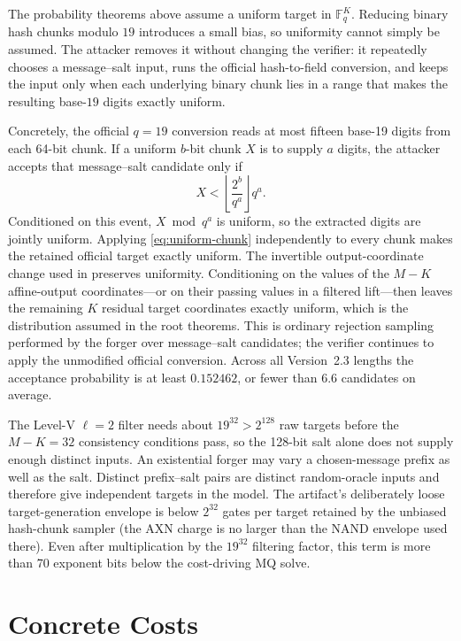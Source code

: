 \documentclass[11pt]{article}
\newcommand{\F}{\mathbb F}
\begin{document}
The probability theorems above assume a uniform target in $\F_q^K$.  Reducing
binary hash chunks modulo $19$ introduces a small bias, so uniformity cannot
simply be assumed.  The attacker removes it without changing the verifier: it
repeatedly chooses a message--salt input, runs the official hash-to-field
conversion, and keeps the input only when each underlying binary chunk lies in
a range that makes the resulting base-$19$ digits exactly uniform.

Concretely, the official $q=19$ conversion reads at most fifteen base-19 digits
from each 64-bit chunk.  If a uniform $b$-bit chunk $X$ is to supply $a$
digits, the attacker accepts that message--salt candidate only if
\begin{equation}\label{eq:uniform-chunk}
 X<\left\lfloor\frac{2^b}{q^a}\right\rfloor q^a.
\end{equation}
Conditioned on this event, $X\bmod q^a$ is uniform, so the extracted
digits are jointly uniform.  Applying \eqref{eq:uniform-chunk} independently
to every chunk makes the retained official target exactly uniform.  The
invertible output-coordinate change used in 
preserves uniformity.  Conditioning on the values of the $M-K$ affine-output coordinates---or on
their passing values in a filtered lift---then leaves the remaining $K$
residual target coordinates exactly uniform, which is the distribution
assumed in the root theorems.  This is
ordinary rejection sampling performed by the forger over message--salt
candidates; the verifier continues to apply the unmodified official
conversion.  Across all Version~2.3 lengths the acceptance probability is at
least $0.152462$, or fewer than 6.6 candidates on average.

The Level-V $\ell=2$ filter needs about $19^{32}>2^{128}$ raw targets before
the $M-K=32$ consistency conditions pass, so the 128-bit salt alone does not
supply enough distinct inputs.  An existential forger may vary a chosen-message
prefix as well as the salt.  Distinct prefix--salt pairs are distinct random-oracle
inputs and therefore give independent targets in the model.  The
artifact's deliberately loose target-generation envelope is below $2^{32}$
gates per target retained by the unbiased hash-chunk sampler (the AXN charge
is no larger than the NAND envelope used there).  Even after multiplication by the $19^{32}$ filtering factor,
this term is more than 70 exponent bits below the cost-driving MQ solve.

\section{Concrete Costs}\label{sec:complexity}
\end{document}
